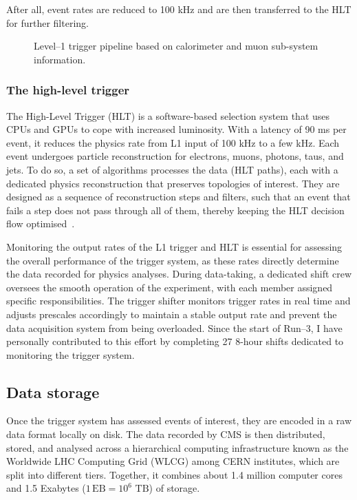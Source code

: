 After all, event rates are reduced to 100 kHz and are then transferred to the HLT for further filtering.

\begin{figure}[h!]
    \centering
    
    \caption{Level--1 trigger pipeline based on calorimeter and muon sub-system information.}
    \label{fig:L1pipeline}
\end{figure}


\subsubsection{The high-level trigger}

The High-Level Trigger (HLT) is a software-based selection system that uses CPUs and GPUs to cope with increased luminosity. With a latency of 90 ms per event, it reduces the physics rate from L1 input of 100 kHz to a few kHz. Each event undergoes particle reconstruction for electrons, muons, photons, taus, and jets. To do so, a set of algorithms processes the data (HLT paths), each with a dedicated physics reconstruction that preserves topologies of interest. They are designed as a sequence of reconstruction steps and filters, such that an event that fails a step does not pass through all of them, thereby keeping the HLT decision flow optimised~\cite{CMShlt}.

\vspace{0.5 cm}

Monitoring the output rates of the L1 trigger and HLT is essential for assessing the overall performance of the trigger system, as these rates directly determine the data recorded for physics analyses. During data-taking, a dedicated shift crew oversees the smooth operation of the experiment, with each member assigned specific responsibilities. The trigger shifter monitors trigger rates in real time and adjusts prescales accordingly to maintain a stable output rate and prevent the data acquisition system from being overloaded. Since the start of Run--3, I have personally contributed to this effort by completing 27 8-hour shifts dedicated to monitoring the trigger system.


\subsection{Data storage}

Once the trigger system has assessed events of interest, they are encoded in a raw data format locally on disk. The data recorded by CMS is then distributed, stored, and analysed across a hierarchical computing infrastructure known as the Worldwide LHC Computing Grid (WLCG) \cite{WLCG} among CERN institutes, which are split into different tiers. Together, it combines about 1.4 million computer cores and 1.5 Exabytes ($1 \, \textrm{EB} = 10^6 \,\, \textrm{TB}$) of storage.

